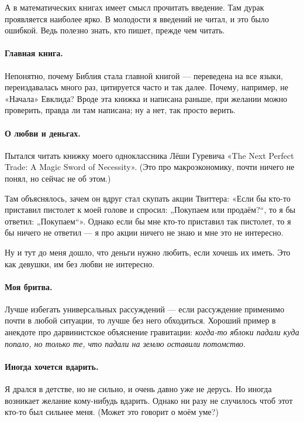 \documentclass{book}
\begin{document}
А в математических книгах имеет смысл прочитать введение.
Там дурак проявляется наиболее ярко.
В молодости я введений не читал, и это было ошибкой. 
Ведь полезно знать, кто пишет, прежде чем читать.

\paragraph{Главная книга.}
Непонятно, почему Библия стала главной книгой --- переведена на все языки, переиздавалась много раз, цитируется часто и так далее.
Почему, например, не «Начала» Евклида?
Вроде эта книжка и написана раньше, при желании можно проверить, правда ли там написана;
ну а нет, так просто верить.

\paragraph{О любви и деньгах.}
Пытался читать книжку моего одноклассника Лёши Гуревича «The Next Perfect Trade: A Magic Sword of Necessity».
(Это про макроэкономику, почти ничего не понял, но сейчас не об этом.)

Там объяснялось, зачем он вдруг стал скупать акции Твиттера: «Если бы кто-то приставил пистолет к моей голове и спросил: „Покупаем или продаём?“, то я бы ответил: „Покупаем“».
Однако если бы мне кто-то приставил так пистолет, то я бы ничего не ответил --- я про акции ничего не знаю и мне это не интересно.

Ну и тут до меня дошло, что деньги нужно любить, если хочешь их иметь.
Это как девушки, им без любви не интересно. 

\paragraph{Моя бритва.}
Лучше избегать универсальных рассуждений --- если рассуждение применимо почти в любой ситуации, то лучше без него обходиться.
Хороший пример в анекдоте про дарвинистское объяснение гравитации: \textit{когда-то яблоки падали куда попало, но только те, что падали на землю оставили потомство}.

\paragraph{Иногда хочется вдарить.}
Я дрался в детстве, но не сильно, и очень давно уже не дерусь.
Но иногда возникает желание кому-нибудь вдарить.
Однако ни разу не случилось чтоб этот кто-то был сильнее меня.
(Может это говорит о моём уме?)
\end{document}
